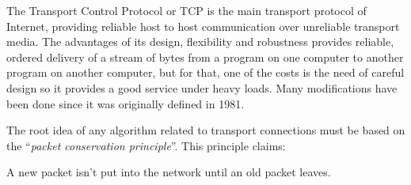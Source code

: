 
The Transport Control Protocol or TCP is the main transport protocol of 
Internet, providing reliable host to host communication over unreliable
transport media\cite{rfc793}. The advantages of its design,
flexibility and robustness provides reliable, ordered delivery of a stream of
bytes from a program on one computer to another program on another computer,
but for that, one of the costs is the need of careful design so it provides a good
service under heavy loads. Many modifications have been done since it was
originally defined in 1981.

The root idea of any algorithm related to transport connections must be based
on the ``\textit{packet conservation principle}''. This principle claims:

\begin{defn}
A new packet isn't put into the network until an old packet leaves.
\end{defn}
